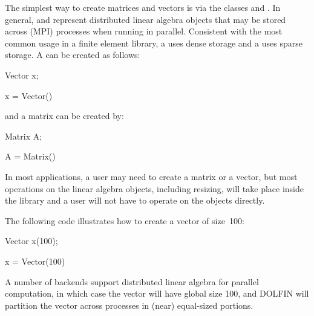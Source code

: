 The simplest way to create matrices and vectors is via the classes
 and . In general,  and 
represent distributed linear algebra objects that may be stored across
(MPI) processes when running in parallel. Consistent with the most common
usage in a finite element library, a  uses dense storage
and a  uses sparse storage.  A  can be created
as follows:

\begin{c++}
Vector x;
\end{c++}

\begin{python}
x = Vector()
\end{python}
and a matrix can be created by:

\begin{c++}
Matrix A;
\end{c++}

\begin{python}
A = Matrix()
\end{python}
In most applications, a user may need to create a matrix or a vector,
but most operations on the linear algebra objects, including resizing,
will take place inside the library and a user will not have to operate
on the objects directly.

The following code illustrates how to create a vector of size~100:
\begin{c++}
Vector x(100);
\end{c++}
\begin{python}
x = Vector(100)
\end{python}
A number of backends support distributed linear algebra for parallel
computation, in which case the vector  will have global size
100, and DOLFIN will partition the vector across processes in (near)
equal-sized portions.

%
%

